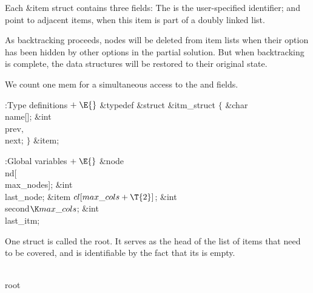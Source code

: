 Each \&{item} struct contains three fields:
The  is the user-specified identifier;
 and  point to adjacent items, when this
item is part of a doubly linked list.

As backtracking proceeds, nodes
will be deleted from item lists when their option has been hidden by
other options in the partial solution.
But when backtracking is complete, the data structures will be
restored to their original state.

We count one mem for a simultaneous access to the  and  fields.

\Y\B\4:Type definitions\X${}\mathrel+\E{}$\6
\&{typedef} \&{struct} \&{itm\_struct} ${}\{{}$\1\6
\&{char} \\{name}[];\6
\&{int} \\{prev}${},{}$ \\{next};\2\6
${}\}{}$ \&{item};\par
\fi

\B{}:Global variables\X${}\mathrel+\E{}$\6
\&{node} \\{nd}[\\{max\_nodes}];\6
\&{int} \\{last\_node};\6
\&{item} ${}\\{cl}[\\{max\_cols}+\T{2}]{}$;\6
\&{int} \\{second}${}\K\\{max\_cols}{}$;\6
\&{int} \\{last\_itm};%
\par
\fi

One  struct is called the root. It serves as the head of the
list of items that need to be covered, and is identifiable by the fact
that its  is empty.

\Y\B\4\D\\{root}\5
\par
\fi

